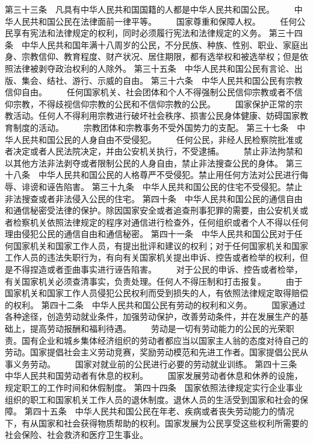      第三十三条　凡具有中华人民共和国国籍的人都是中华人民共和国公民。
　　中华人民共和国公民在法律面前一律平等。
　　国家尊重和保障人权。
　　任何公民享有宪法和法律规定的权利，同时必须履行宪法和法律规定的义务。
     第三十四条　中华人民共和国年满十八周岁的公民，不分民族、种族、性别、职业、家庭出身、宗教信仰、教育程度、财产状况、居住期限，都有选举权和被选举权；但是依照法律被剥夺政治权利的人除外。
     第三十五条　中华人民共和国公民有言论、出版、集会、结社、游行、示威的自由。
     第三十六条　中华人民共和国公民有宗教信仰自由。
 　　任何国家机关、社会团体和个人不得强制公民信仰宗教或者不信仰宗教，不得歧视信仰宗教的公民和不信仰宗教的公民。
 　　国家保护正常的宗教活动。任何人不得利用宗教进行破坏社会秩序、损害公民身体健康、妨碍国家教育制度的活动。
　　宗教团体和宗教事务不受外国势力的支配。
     第三十七条　中华人民共和国公民的人身自由不受侵犯。
　　任何公民，非经人民检察院批准或者决定或者人民法院决定，并由公安机关执行，不受逮捕。
　　禁止非法拘禁和以其他方法非法剥夺或者限制公民的人身自由，禁止非法搜查公民的身体。
     第三十八条　中华人民共和国公民的人格尊严不受侵犯。禁止用任何方法对公民进行侮辱、诽谤和诬告陷害。
     第三十九条　中华人民共和国公民的住宅不受侵犯。禁止非法搜查或者非法侵入公民的住宅。
     第四十条　中华人民共和国公民的通信自由和通信秘密受法律的保护。除因国家安全或者追查刑事犯罪的需要，由公安机关或者检察机关依照法律规定的程序对通信进行检查外，任何组织或者个人不得以任何理由侵犯公民的通信自由和通信秘密。
     第四十一条　中华人民共和国公民对于任何国家机关和国家工作人员，有提出批评和建议的权利；对于任何国家机关和国家工作人员的违法失职行为，有向有关国家机关提出申诉、控告或者检举的权利，但是不得捏造或者歪曲事实进行诬告陷害。
　　对于公民的申诉、控告或者检举，有关国家机关必须查清事实，负责处理。任何人不得压制和打击报复。
　　由于国家机关和国家工作人员侵犯公民权利而受到损失的人，有依照法律规定取得赔偿的权利。
     第四十二条　中华人民共和国公民有劳动的权利和义务。
 　　国家通过各种途径，创造劳动就业条件，加强劳动保护，改善劳动条件，并在发展生产的基础上，提高劳动报酬和福利待遇。
 　　劳动是一切有劳动能力的公民的光荣职责。国有企业和城乡集体经济组织的劳动者都应当以国家主人翁的态度对待自己的劳动。国家提倡社会主义劳动竞赛，奖励劳动模范和先进工作者。国家提倡公民从事义务劳动。
　　国家对就业前的公民进行必要的劳动就业训练。
     第四十三条　中华人民共和国劳动者有休息的权利。
　　国家发展劳动者休息和休养的设施，规定职工的工作时间和休假制度。
     第四十四条　国家依照法律规定实行企业事业组织的职工和国家机关工作人员的退休制度。退休人员的生活受到国家和社会的保障。
     第四十五条　中华人民共和国公民在年老、疾病或者丧失劳动能力的情况下，有从国家和社会获得物质帮助的权利。国家发展为公民享受这些权利所需要的社会保险、社会救济和医疗卫生事业。
